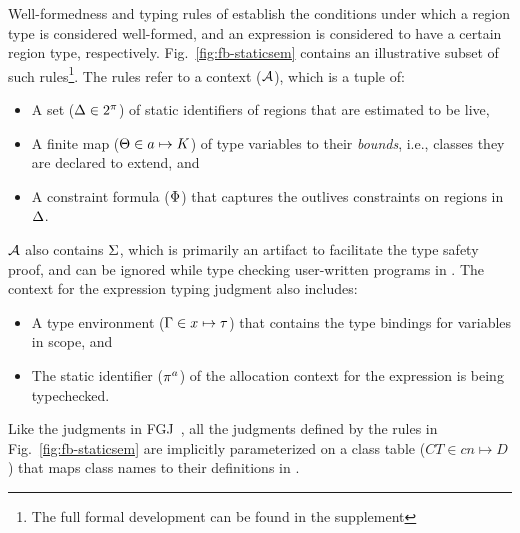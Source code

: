 Well-formedness and typing rules of \fbname establish the conditions
under which a region type is considered well-formed, and an expression
is considered to have a certain region type, respectively.
Fig.~\ref{fig:fb-staticsem} contains an illustrative subset of such
rules\footnote{The full formal development can be found in the
supplement}. The rules refer to a context (${\mathcal{A}}$), which is a tuple of:
\begin{itemize}
\item A set ($\Delta \in 2^\pi$) of static identifiers of regions
that are estimated to be live,
\item A finite map ($\Theta \in a \mapsto K$) of type
variables to their \emph{bounds}, i.e., classes they are declared to
extend, and
\item A constraint formula ($\Phi$) that captures the outlives
constraints on regions in $\Delta$.
\end{itemize}
${\mathcal{A}}$ also contains $\Sigma$, 
which is primarily an artifact to facilitate the type safety proof,
and can be ignored while type checking user-written programs
in \FB. The context for the expression typing judgment also includes:
\begin{itemize}
\item A type environment ($\Gamma \in x \mapsto \tau$) that contains the
type bindings for variables in scope, and 
\item The static identifier ($\pi^a$) of the allocation context for
the expression is being typechecked.  
\end{itemize}
Like the judgments in FGJ~\cite{fgj}, all the judgments defined by the
rules in Fig.~\ref{fig:fb-staticsem} are implicitly parameterized on a
class table ($CT \in cn \mapsto D$) that maps class names to their
definitions in \FB.

